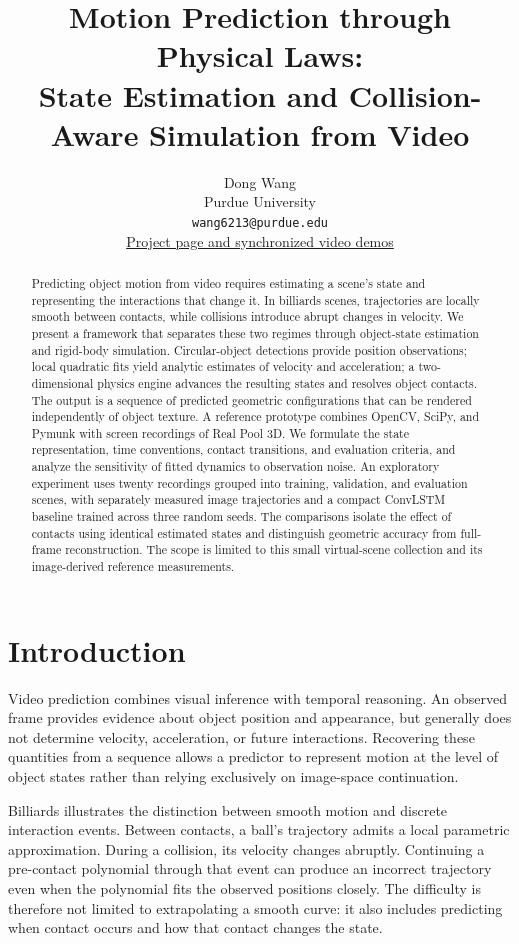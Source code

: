 \documentclass{article}
\title{Motion Prediction through Physical Laws:\\
State Estimation and Collision-Aware Simulation from Video}
\author{
  Dong Wang \\
  Purdue University \\
  \texttt{wang6213@purdue.edu}\\[3pt]
  \small\href{https://aabbccdkg.github.io/Video_prediction_through_physical_laws/}{Project page and synchronized video demos}
}
\begin{document}
\maketitle

\begin{abstract}
Predicting object motion from video requires estimating a scene's state and representing the interactions that change it. In billiards scenes, trajectories are locally smooth between contacts, while collisions introduce abrupt changes in velocity. We present a framework that separates these two regimes through object-state estimation and rigid-body simulation. Circular-object detections provide position observations; local quadratic fits yield analytic estimates of velocity and acceleration; a two-dimensional physics engine advances the resulting states and resolves object contacts. The output is a sequence of predicted geometric configurations that can be rendered independently of object texture. A reference prototype combines OpenCV, SciPy, and Pymunk with screen recordings of Real Pool 3D. We formulate the state representation, time conventions, contact transitions, and evaluation criteria, and analyze the sensitivity of fitted dynamics to observation noise. An exploratory experiment uses twenty recordings grouped into training, validation, and evaluation scenes, with separately measured image trajectories and a compact ConvLSTM baseline trained across three random seeds. The comparisons isolate the effect of contacts using identical estimated states and distinguish geometric accuracy from full-frame reconstruction. The scope is limited to this small virtual-scene collection and its image-derived reference measurements.
\end{abstract}

\section{Introduction}

Video prediction combines visual inference with temporal reasoning. An observed frame provides evidence about object position and appearance, but generally does not determine velocity, acceleration, or future interactions. Recovering these quantities from a sequence allows a predictor to represent motion at the level of object states rather than relying exclusively on image-space continuation.

Billiards illustrates the distinction between smooth motion and discrete interaction events. Between contacts, a ball's trajectory admits a local parametric approximation. During a collision, its velocity changes abruptly. Continuing a pre-contact polynomial through that event can produce an incorrect trajectory even when the polynomial fits the observed positions closely. The difficulty is therefore not limited to extrapolating a smooth curve: it also includes predicting when contact occurs and how that contact changes the state.
\end{document}
